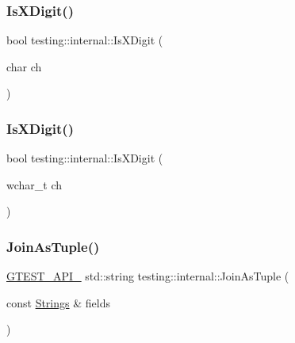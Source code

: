 \mbox{\label{namespacetesting_1_1internal_aa234ef141278263fb143b616c74c86e7}} 
\subsubsection{\texorpdfstring{IsXDigit()}{IsXDigit()}\hspace{0.1cm}{\footnotesize\ttfamily [1/2]}}
{\footnotesize\ttfamily bool testing\+::internal\+::\+Is\+X\+Digit (\begin{DoxyParamCaption}\item[{char}]{ch }\end{DoxyParamCaption})\hspace{0.3cm}{\ttfamily [inline]}}

\mbox{\label{namespacetesting_1_1internal_a6ab68a30f8291c09b2289c132bbe3b16}} 
\subsubsection{\texorpdfstring{IsXDigit()}{IsXDigit()}\hspace{0.1cm}{\footnotesize\ttfamily [2/2]}}
{\footnotesize\ttfamily bool testing\+::internal\+::\+Is\+X\+Digit (\begin{DoxyParamCaption}\item[{wchar\+\_\+t}]{ch }\end{DoxyParamCaption})\hspace{0.3cm}{\ttfamily [inline]}}

\mbox{\label{namespacetesting_1_1internal_a4ffe5309bf49f08145ed010a6d244e41}} 
\subsubsection{\texorpdfstring{JoinAsTuple()}{JoinAsTuple()}}
{\footnotesize\ttfamily \mbox{\hyperlink{_obj__test_2lib_2googletest-release-1_88_81_2googletest_2include_2gtest_2internal_2gtest-port_8h_aa73be6f0ba4a7456180a94904ce17790}{G\+T\+E\+S\+T\+\_\+\+A\+P\+I\+\_\+}} std\+::string testing\+::internal\+::\+Join\+As\+Tuple (\begin{DoxyParamCaption}\item[{const \mbox{\hyperlink{namespacetesting_1_1internal_a4ad7524c75dfadde584df6d5b4742aa8}{Strings}} \&}]{fields }\end{DoxyParamCaption})}

